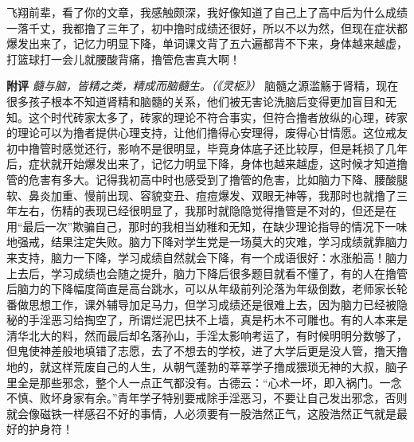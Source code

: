 \begin{case}
    飞翔前辈，看了你的文章，我感触颇深，我好像知道了自己上了高中后为什么成绩一落千丈，我都撸了三年了，初中撸时成绩还很好，所以不以为然，但现在症状都爆发出来了，记忆力明显下降，单词课文背了五六遍都背不下来，身体越来越虚，打篮球打一会儿就腰酸背痛，撸管危害真大啊！

    \textbf{附评} \textit{髓与脑，皆精之类，精成而脑髓生。（《灵枢》）} 脑髓之源滥觞于肾精，现在很多孩子根本不知道肾精和脑髓的关系，他们被无害论洗脑后变得更加盲目和无知。这个时代砖家太多了，砖家的理论不符合事实，但符合撸者放纵的心理，砖家的理论可以为撸者提供心理支持，让他们撸得心安理得，废得心甘情愿。这位戒友初中撸管时感觉还行，影响不是很明显，毕竟身体底子还比较厚，但是耗损了几年后，症状就开始爆发出来了，记忆力明显下降，身体也越来越虚，这时候才知道撸管的危害有多大。记得我初高中时也感受到了撸管的危害，比如脑力下降、腰酸腿软、鼻炎加重、慢前出现、容貌变丑、痘痘爆发、双眼无神等，我那时也就撸了三年左右，伤精的表现已经很明显了，我那时就隐隐觉得撸管是不对的，但还是在用“最后一次”欺骗自己，那时的我相当幼稚和无知，在缺少理论指导的情况下一味地强戒，结果注定失败。脑力下降对学生党是一场莫大的灾难，学习成绩就靠脑力来支持，脑力一下降，学习成绩自然就会下降，有一个成语很好：水涨船高！脑力上去后，学习成绩也会随之提升，脑力下降后很多题目就看不懂了，有的人在撸管后脑力的下降幅度简直是高台跳水，可以从年级前列沦落为年级倒数，老师家长轮番做思想工作，课外辅导加足马力，但学习成绩还是很难上去，因为脑力已经被隐秘的手淫恶习给掏空了，所谓烂泥巴扶不上墙，真是朽木不可雕也。有的人本来是清华北大的料，然而最后却名落孙山，手淫太影响考运了，有时候明明分数够了，但鬼使神差般地填错了志愿，去了不想去的学校，进了大学后更是没人管，撸天撸地的，就这样荒废自己的人生，从朝气蓬勃的莘莘学子撸成猥琐无神的大叔，脑子里全是那些邪念，整个人一点正气都没有。古德云：“心术一坏，即入祸门。一念不慎、败坏身家有余。”青年学子特别要戒除手淫恶习，不要让自己发出邪念，否则就会像磁铁一样感召不好的事情，人必须要有一股浩然正气，这股浩然正气就是最好的护身符！
\end{case}

